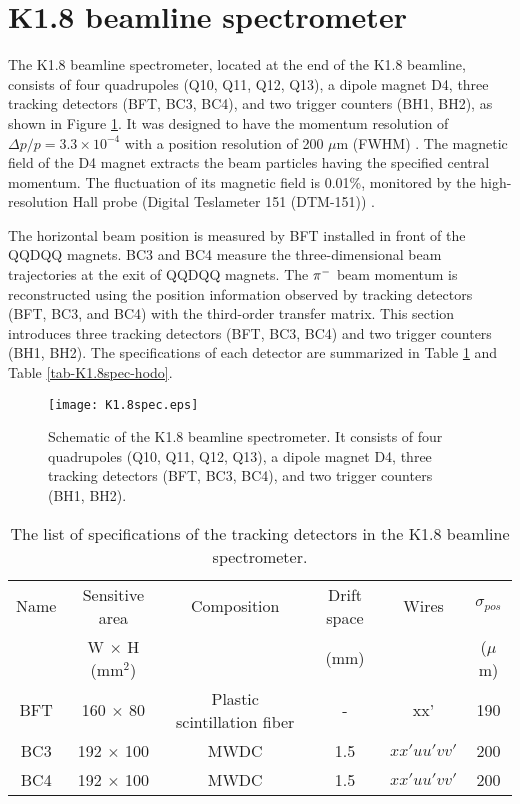 \section{K1.8 beamline spectrometer}
\label{sec-k18beamspec}

The K1.8 beamline spectrometer, located at the end of the K1.8 beamline, consists of four quadrupoles (Q10, Q11, Q12, Q13), a dipole magnet D4, three tracking detectors (BFT, BC3, BC4), and two trigger counters (BH1, BH2), as shown in Figure \ref{fig-K1.8spec}. It was designed to have the momentum resolution of $\Delta p/p = 3.3\times10^{-4}$ with a position resolution of 200 $\mu$m (FWHM) \cite{K1.8}. The magnetic field of the D4 magnet extracts the beam particles having the specified central momentum. The fluctuation of its magnetic field is 0.01\%, monitored by the high-resolution Hall probe (Digital Teslameter 151 (DTM-151)) \cite{DTM-151}.

The horizontal beam position is measured by BFT installed in front of the QQDQQ magnets. BC3 and BC4 measure the three-dimensional beam trajectories at the exit of QQDQQ magnets. The $\pi^{-}$ beam momentum is reconstructed using the position information observed by tracking detectors (BFT, BC3, and BC4) with the third-order transfer matrix. This section introduces three tracking detectors (BFT, BC3, BC4) and two trigger counters (BH1, BH2). The specifications of each detector are summarized in Table \ref{tab-K1.8spec-tracker} and Table \ref{tab-K1.8spec-hodo}.

\begin{figure}[!h]
 \begin{center}
   \texttt{[image: K1.8spec.eps]}
   \caption{Schematic of the K1.8 beamline spectrometer. It consists of four quadrupoles (Q10, Q11, Q12, Q13), a dipole magnet D4, three tracking detectors (BFT, BC3, BC4), and two trigger counters (BH1, BH2).}
   \label{fig-K1.8spec}
 \end{center}
\end{figure}

\begin{table}[h]
  \begin{center}
    \caption{The list of specifications of the tracking detectors in the K1.8 beamline spectrometer.}
    \begin{tabular}{cccccc} \hline \hline
      Name & Sensitive area & Composition & Drift space & Wires & $\sigma_{pos}$\\
       & W $\times$ H (mm$^2$) & & (mm) & & ($\mu$m) \\ \hline
      BFT & 160 $\times$ 80 & Plastic scintillation fiber & - & xx' & 190 \\
      BC3 & 192 $\times$ 100 & MWDC & 1.5 & $xx'uu'vv'$ & 200  \\ 
      BC4 & 192 $\times$ 100 & MWDC & 1.5 & $xx'uu'vv'$ & 200 \\ 
\hline\hline
   \end{tabular}
   \label{tab-K1.8spec-tracker}
   \end{center}
\end{table}


